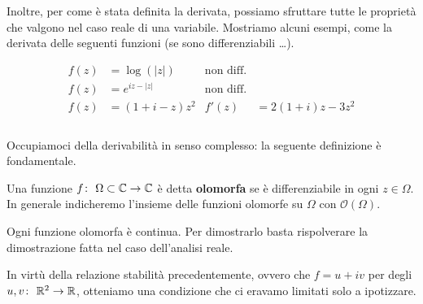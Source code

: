 Inoltre, per come è stata definita la derivata, possiamo sfruttare tutte le proprietà che valgono nel caso reale di una variabile. Mostriamo alcuni esempi, come la derivata delle seguenti funzioni (se sono differenziabili \dots).

	\begin{equation*} 
	\begin{aligned}
		f(z) & = \log(|z|) 			& \text{non diff.} &  \\
		f(z) & = e^{iz - |z|} 		& \text{non diff.} & \\
		f(z) & = (1 + i - z)z^2  	& f'(z) & = 2(1+i)z - 3z^2 \\
	\end{aligned} 
	\end{equation*}
\\

Occupiamoci della derivabilità in senso complesso: la seguente definizione è fondamentale.

\begin{definition}
	Una funzione $f \colon\ \Omega \subset \mathbb{C} \rightarrow \mathbb{C}$ è detta \textbf{olomorfa} se è differenziabile in ogni $z \in \Omega$. In generale indicheremo l'insieme delle funzioni olomorfe su $\Omega$ con $\mathcal{O}(\Omega)$.
\end{definition}

\begin{remark}
	Ogni funzione olomorfa è continua. Per dimostrarlo basta rispolverare la dimostrazione fatta nel caso dell'analisi reale.
\end{remark}

In virtù della relazione stabilità precedentemente, ovvero che $f = u + iv$ per degli $u,v \colon\ \mathbb{R}^2 \rightarrow \mathbb{R}$, otteniamo una condizione che ci eravamo limitati solo a ipotizzare.

